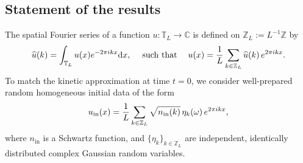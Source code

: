 \documentclass[UTF-8,reqno]{amsart}
\numberwithin{equation}{section}
\theoremstyle{definition}
\def\dif{{\mathord{{\rm d}}}}
\def\dif{{\mathord{{\rm d}}}}
\begin{document}
\subsection{Statement of the results}  

The spatial Fourier series of a function $u: \mathbb{T}_L \to \mathbb C$ is defined on $\mathbb{Z}_L:=L^{-1}\mathbb{Z}$ by
\begin{equation*}
\widehat{u}(k)=\int_{\mathbb{T}_L} u(x) e^{-2\pi i kx}\dif x,\quad \mathrm{\; such \ that \;}\quad u(x)=\frac{1}{L}\sum_{k \in \mathbb{Z}_L} \widehat{u}(k) \,e^{2\pi i kx}. 
\end{equation*}
 To match the kinetic approximation at time $t=0$, we consider 
well-prepared random homogeneous initial data of the form
 \begin{equation}\label{wellprepared}
 u_{\rm in}(x)=\frac{1}{L}\sum_{k \in \mathbb{Z}_L}\sqrt{n_{\textrm{in}}(k)} \, \eta_{k}(\omega)\,e^{2\pi i kx},
\end{equation}
where $n_{\mathrm{in}}$ is a Schwartz function,
and $\{\eta_k\}_{k\in\mathbb{Z}_L}$ are independent, identically distributed 
complex Gaussian random variables.
\end{document}
